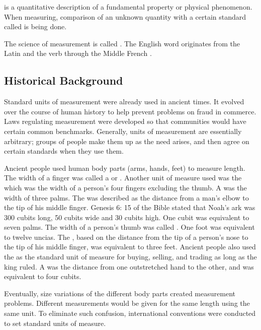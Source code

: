 \begin{definition}[Measurement]
 is a quantitative description of a fundamental property or physical
phenomenon. When measuring, comparison of an unknown quantity with a certain
standard called  is being done.

The science of measurement is called . The English word 
originates from the Latin  and the verb  through the Middle French .
\end{definition}

\subsection*{Historical Background}
Standard units of measurement were already used in ancient times. It evolved over
the course of human history to help prevent problems on fraud in commerce. Laws
regulating measurement were developed so that communities would have certain common
benchmarks. Generally, units of measurement are essentially arbitrary; groups of people
make them up as the need arises, and then agree on certain standards when they use them.

Ancient people used human body parts (arms, hands, feet) to measure length. The
width of a finger was called a  or . Another unit of measure used was the 
which was the width of a person’s four fingers excluding the thumb. A  was the width of
three palms. The  was described as the distance from a man’s elbow to the tip of his
middle finger. Genesis 6: 15 of the Bible stated that Noah’s ark was 300 cubits long, 50
cubits wide and 30 cubits high. One cubit was equivalent to seven palms. The width of a
person’s thumb was called . One foot was equivalent to twelve uncias. The , based
on the distance from the tip of a person’s nose to the tip of his middle finger, was
equivalent to three feet. Ancient people also used the  as the standard unit of
measure for buying, selling, and trading as long as the king ruled. A  was the distance
from one outstretched hand to the other, and was equivalent to four cubits.

Eventually, size variations of the different body parts created measurement
problems. Different measurements would be given for the same length using the same unit.
To eliminate such confusion, international conventions were conducted to set standard
units of measure.


